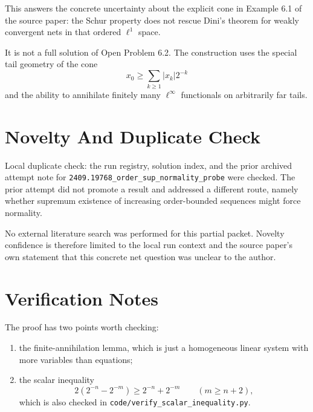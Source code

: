 \documentclass[11pt]{article}
\begin{document}
This answers the concrete uncertainty about the explicit cone in Example 6.1
of the source paper: the Schur property does not rescue Dini's theorem for
weakly convergent nets in that ordered \(\ell^1\) space.

It is not a full solution of Open Problem 6.2.  The construction uses the
special tail geometry of the cone
\[
  x_0\geq \sum_{k\geq1}|x_k|2^{-k}
\]
and the ability to annihilate finitely many \(\ell^\infty\) functionals on
arbitrarily far tails.

\section*{Novelty And Duplicate Check}

Local duplicate check: the run registry, solution index, and the prior
archived attempt note for \texttt{2409.19768\_order\_sup\_normality\_probe}
were checked.  The prior attempt did not promote a result and addressed a
different route, namely whether supremum existence of increasing order-bounded
sequences might force normality.

No external literature search was performed for this partial packet.  Novelty
confidence is therefore limited to the local run context and the source
paper's own statement that this concrete net question was unclear to the
author.

\section*{Verification Notes}

The proof has two points worth checking:
\begin{enumerate}
\item the finite-annihilation lemma, which is just a homogeneous linear system
with more variables than equations;
\item the scalar inequality
\[
  2(2^{-n}-2^{-m})\geq2^{-n}+2^{-m}\qquad(m\geq n+2),
\]
which is also checked in \texttt{code/verify\_scalar\_inequality.py}.
\end{enumerate}
\end{document}
